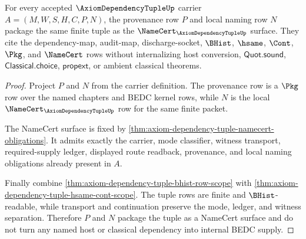\begin{theorem}
\label{thm:axiom-dependency-tuple-pkg-namecert-scope}
For every accepted $\AxiomDependencyTupleUp$ carrier
$A=(M,W,S,H,C,P,N)$, the provenance row $P$ and local naming row $N$ package
the same finite tuple as the $\NameCert_{\AxiomDependencyTupleUp}$ surface.
They cite the dependency-map, audit-map, discharge-socket, $\BHist$, $\hsame$,
$\Cont$, $\Pkg$, and $\NameCert$ rows without internalizing host conversion,
$\mathsf{Quot.sound}$, $\mathsf{Classical.choice}$, $\mathsf{propext}$, or
ambient classical theorems.
\end{theorem}
\begin{proof}
Project $P$ and $N$ from the carrier definition. The provenance row is a
$\Pkg$ row over the named chapters and BEDC kernel rows, while $N$ is the local
$\NameCert_{\AxiomDependencyTupleUp}$ row for the same finite packet.

The NameCert surface is fixed by
\autoref{thm:axiom-dependency-tuple-namecert-obligations}. It admits exactly
the carrier, mode classifier, witness transport, required-supply ledger,
displayed route readback, provenance, and local naming obligations already
present in $A$.

Finally combine \autoref{thm:axiom-dependency-tuple-bhist-row-scope} with
\autoref{thm:axiom-dependency-tuple-hsame-cont-scope}. The tuple rows are
finite and $\BHist$-readable, while transport and continuation preserve the
mode, ledger, and witness separation. Therefore $P$ and $N$ package the tuple
as a NameCert surface and do not turn any named host or classical dependency
into internal BEDC supply.
\end{proof}

